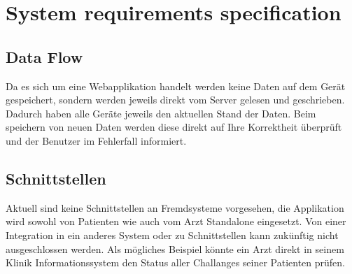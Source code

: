 \chapter{System requirements specification}
\section{Data Flow}
Da es sich um eine Webapplikation handelt werden keine Daten auf dem Ger\"{a}t gespeichert, sondern werden jeweils direkt vom Server gelesen und geschrieben. Dadurch haben alle Ger\"{a}te jeweils den aktuellen Stand der Daten. Beim speichern von neuen Daten werden diese direkt auf Ihre Korrektheit \"{u}berpr\"{u}ft und der Benutzer im Fehlerfall informiert.
\section{Schnittstellen}
Aktuell sind keine Schnittstellen an Fremdsysteme vorgesehen, die Applikation wird sowohl von Patienten wie auch vom Arzt Standalone eingesetzt. Von einer Integration in ein anderes System oder zu Schnittstellen kann zuk\"{u}nftig nicht ausgeschlossen werden. Als m\"{o}gliches Beispiel k\"{o}nnte ein Arzt direkt in seinem Klinik Informationssystem den Status aller Challanges seiner Patienten pr\"{u}fen.